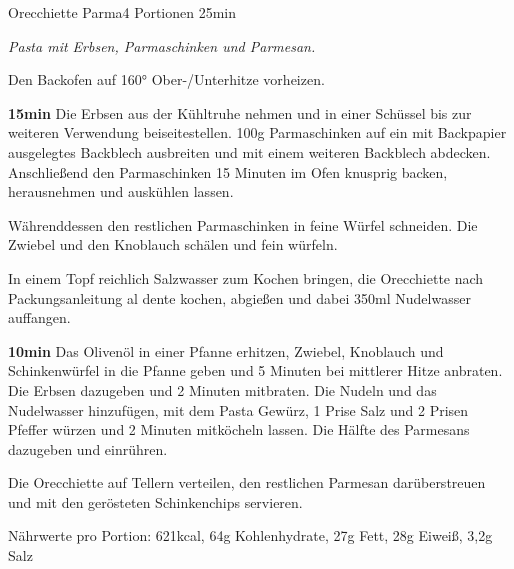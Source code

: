 \documentclass[../recipe-collections/cooking.tex]{subfiles}
\begin{document}
\begin{recipe}{Orecchiette Parma}{4 Portionen }{25min }

  \freeform{}\textit{Pasta mit Erbsen, Parmaschinken und Parmesan.}

  \newstep{}Den Backofen auf 160° Ober-/Unterhitze vorheizen.


  \textbf{15min}
  Die Erbsen aus der Kühltruhe nehmen und in einer Schüssel bis zur weiteren Verwendung beiseitestellen.
  100g Parmaschinken auf ein mit Backpapier ausgelegtes Backblech ausbreiten und mit einem weiteren Backblech abdecken.
  Anschließend den Parmaschinken 15 Minuten im Ofen knusprig backen, herausnehmen und auskühlen lassen.


  Währenddessen den restlichen Parmaschinken in feine Würfel schneiden.
  Die Zwiebel und den Knoblauch schälen und fein würfeln.


  In einem Topf reichlich Salzwasser zum Kochen bringen, die Orecchiette nach Packungsanleitung al dente kochen, abgießen und dabei 350ml Nudelwasser auffangen.


  \textbf{10min}
  Das Olivenöl in einer Pfanne erhitzen, Zwiebel, Knoblauch und Schinkenwürfel in die Pfanne geben und 5 Minuten bei mittlerer Hitze anbraten.
  Die Erbsen dazugeben und 2 Minuten mitbraten.
  Die Nudeln und das Nudelwasser hinzufügen, mit dem Pasta Gewürz, 1 Prise Salz und 2 Prisen Pfeffer würzen und 2 Minuten mitköcheln lassen.
  Die Hälfte des Parmesans dazugeben und einrühren.

  \newstep{}Die Orecchiette auf Tellern verteilen, den restlichen Parmesan darüberstreuen und mit den gerösteten Schinkenchips servieren.

  \freeform{}\hrulefill{}

  \freeform{}
  Nährwerte pro Portion: 621kcal, 64g Kohlenhydrate, 27g Fett, 28g Eiweiß, 3,2g Salz

\end{recipe}
\end{document}
